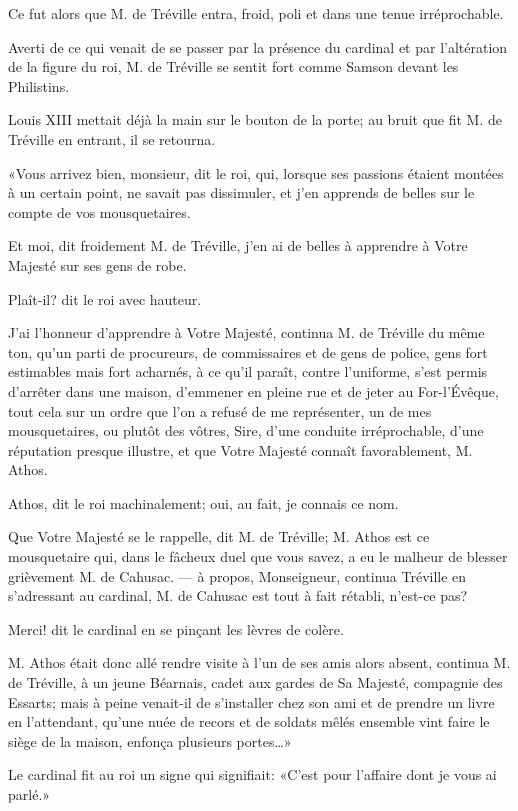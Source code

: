 Ce fut alors que M. de Tréville entra, froid, poli et dans une tenue irréprochable. 

Averti de ce qui venait de se passer par la présence du cardinal et par l'altération de la figure du roi, M. de Tréville se sentit fort comme Samson devant les Philistins. 

Louis XIII mettait déjà la main sur le bouton de la porte; au bruit que fit M. de Tréville en entrant, il se retourna. 

«Vous arrivez bien, monsieur, dit le roi, qui, lorsque ses passions étaient montées à un certain point, ne savait pas dissimuler, et j'en apprends de belles sur le compte de vos mousquetaires. 

\speak  Et moi, dit froidement M. de Tréville, j'en ai de belles à apprendre à Votre Majesté sur ses gens de robe. 

\speak  Plaît-il? dit le roi avec hauteur. 

\speak  J'ai l'honneur d'apprendre à Votre Majesté, continua M. de Tréville du même ton, qu'un parti de procureurs, de commissaires et de gens de police, gens fort estimables mais fort acharnés, à ce qu'il paraît, contre l'uniforme, s'est permis d'arrêter dans une maison, d'emmener en pleine rue et de jeter au For-l'Évêque, tout cela sur un ordre que l'on a refusé de me représenter, un de mes mousquetaires, ou plutôt des vôtres, Sire, d'une conduite irréprochable, d'une réputation presque illustre, et que Votre Majesté connaît favorablement, M. Athos. 

\speak  Athos, dit le roi machinalement; oui, au fait, je connais ce nom. 

\speak  Que Votre Majesté se le rappelle, dit M. de Tréville; M. Athos est ce mousquetaire qui, dans le fâcheux duel que vous savez, a eu le malheur de blesser grièvement M. de Cahusac. --- à propos, Monseigneur, continua Tréville en s'adressant au cardinal, M. de Cahusac est tout à fait rétabli, n'est-ce pas? 

\speak  Merci! dit le cardinal en se pinçant les lèvres de colère. 

\speak  M. Athos était donc allé rendre visite à l'un de ses amis alors absent, continua M. de Tréville, à un jeune Béarnais, cadet aux gardes de Sa Majesté, compagnie des Essarts; mais à peine venait-il de s'installer chez son ami et de prendre un livre en l'attendant, qu'une nuée de recors et de soldats mêlés ensemble vint faire le siège de la maison, enfonça plusieurs portes\dots» 

Le cardinal fit au roi un signe qui signifiait: «C'est pour l'affaire dont je vous ai parlé.» 


